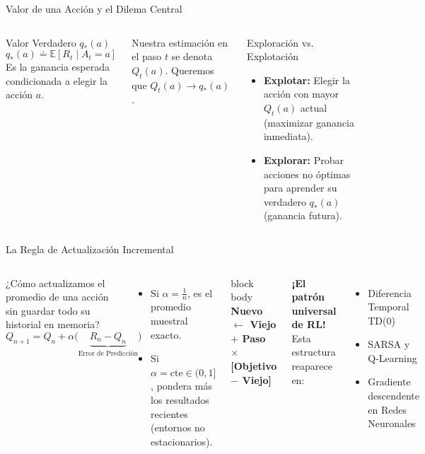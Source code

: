 \begin{frame}{Valor de una Acción y el Dilema Central}
  \begin{columns}[T,onlytextwidth]
      \begin{block}{Valor Verdadero $q_*(a)$}
        \[
          q_*(a) \doteq \mathbb{E}[R_t \mid A_t = a]
        \]
        Es la ganancia esperada condicionada a elegir la acción $a$.
      \end{block}
      \vspace{0.2cm}
      Nuestra estimación en el paso $t$ se denota $Q_t(a)$. Queremos que $Q_t(a) \to q_*(a)$.
      \begin{alertblock}{Exploración vs. Explotación}
        \begin{itemize}
          \item \textbf{Explotar:} Elegir la acción con mayor $Q_t(a)$ actual (maximizar ganancia inmediata).
          \item \textbf{Explorar:} Probar acciones no óptimas para aprender su verdadero $q_*(a)$ (ganancia futura).
        \end{itemize}
      \end{alertblock}
  \end{columns}
  \vspace{0.4cm}
\end{frame}

\begin{frame}{La Regla de Actualización Incremental}
  \begin{columns}[c,onlytextwidth]
      ¿Cómo actualizamos el promedio de una acción sin guardar todo su historial en memoria?
      \[
        Q_{n+1} = Q_n + \alpha \Big( \underbrace{R_n - Q_n}_{\text{Error de Predicción}} \Big)
      \]
      \begin{itemize}
        \item Si $\alpha = \frac{1}{n}$, es el promedio muestral exacto.
        \item Si $\alpha = \text{cte} \in (0, 1]$, pondera más los resultados recientes (entornos no estacionarios).
      \end{itemize}
      \begin{beamercolorbox}[rounded=true,sep=0.7em]{block body}
        \centering\bfseries
        Nuevo $\leftarrow$ Viejo $+$ Paso $\times$ [Objetivo $-$ Viejo]
      \end{beamercolorbox}
      \vspace{0.3cm}
      \small \textbf{¡El patrón universal de RL!}\\
      Esta estructura reaparece en:
      \begin{itemize}
        \item Diferencia Temporal TD(0)
        \item SARSA y Q-Learning
        \item Gradiente descendente en Redes Neuronales
      \end{itemize}
  \end{columns}
\end{frame}

